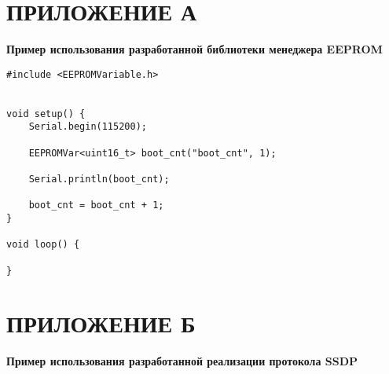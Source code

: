 \chapter*{ПРИЛОЖЕНИЕ А} \label{app:appendix-eeprom-usage-example}

\begin{center}
    \bfseries Пример использования разработанной библиотеки менеджера EEPROM
\end{center}

\begin{verbatim}
#include <EEPROMVariable.h>


void setup() {
    Serial.begin(115200);

    EEPROMVar<uint16_t> boot_cnt("boot_cnt", 1);

    Serial.println(boot_cnt);

    boot_cnt = boot_cnt + 1;
}

void loop() {

}
\end{verbatim}


\chapter*{ПРИЛОЖЕНИЕ Б} \label{app:appendix-ssdp-usage-example}

\begin{center}
    \bfseries Пример использования разработанной реализации протокола SSDP
\end{center}

